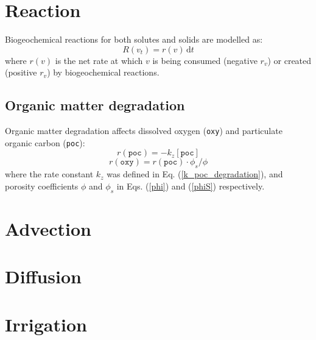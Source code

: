 \documentclass{article}
\newcommand{\D}[1]{\mathrm{d}#1}
\newcommand{\code}[1]{\texttt{#1}}
\newcommand{\conc}[1]{[\code{#1}]}
\newcommand{\eqref}[1]{(\ref{#1})}
\begin{document}
\section{Reaction}

Biogeochemical reactions for both solutes and solids are modelled as:
\begin{equation}
R(v_t) = r(v) \, \D{t}
\end{equation}
where $r(v)$ is the net rate at which $v$ is being consumed (negative $r_v$) or created (positive $r_v$) by biogeochemical reactions.

\subsection{Organic matter degradation}

Organic matter degradation affects dissolved oxygen (\code{oxy}) and particulate organic carbon (\code{poc}):
\begin{equation}
r(\code{poc}) = -k_z \conc{poc}
\end{equation}
\begin{equation}
r(\code{oxy}) = r(\code{poc}) \cdot \phi_s / \phi
\end{equation}
where the rate constant $k_z$ was defined in Eq. \eqref{k_poc_degradation}, and porosity coefficients $\phi$ and $\phi_s$ in Eqs. \eqref{phi} and \eqref{phiS} respectively.

\section{Advection}

\section{Diffusion}

\section{Irrigation}


\end{document}
